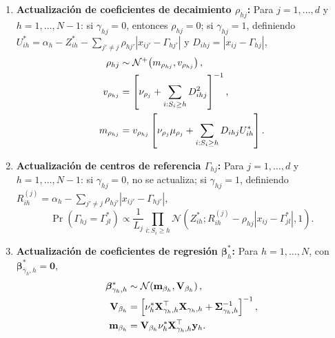 \begin{enumerate}
    \item \textbf{Actualización de coeficientes de decaimiento $\rho_{hj}$:}
    Para $j = 1, \dots, d$ y $h = 1, \dots, N-1$: si $\gamma_{hj} = 0$,
    entonces $\rho_{hj} = 0$; si $\gamma_{hj} = 1$, definiendo
    $U_{ih}^* = \alpha_h - Z_{ih}^* - \sum_{j' \neq j}\rho_{hj'}
    |x_{ij'} - \Gamma_{hj'}|$ y $D_{ihj} = |x_{ij} - \Gamma_{hj}|$,
    \begin{align}
    \rho_{hj} &\sim \mathcal{N}^+\!\left(m_{\rho_{hj}},
    v_{\rho_{hj}}\right), \notag\\
    v_{\rho_{hj}} &= \left[\nu_{\rho_j}
    + \sum_{i:S_i \geq h} D_{ihj}^2\right]^{-1}, \notag\\
    m_{\rho_{hj}} &= v_{\rho_{hj}}\left[\nu_{\rho_j}\mu_{\rho_j}
    + \sum_{i:S_i \geq h} D_{ihj} U_{ih}^*\right].
    \end{align}
 
    \item \textbf{Actualización de centros de referencia $\Gamma_{hj}$:}
    Para $j = 1, \dots, d$ y $h = 1, \dots, N-1$: si $\gamma_{hj} = 0$,
    no se actualiza; si $\gamma_{hj} = 1$, definiendo
    $R_{ih}^{(j)} = \alpha_h - \sum_{j' \neq j}\rho_{hj'}|x_{ij'} - \Gamma_{hj'}|$,
    \begin{equation}
        \Pr(\Gamma_{hj} = \Gamma_{jl}^*) \propto
        \frac{1}{L_j} \prod_{i:S_i \geq h}
        \mathcal{N}\!\left(Z_{ih}^*;
        R_{ih}^{(j)} - \rho_{hj}|x_{ij} - \Gamma_{jl}^*|, 1\right).
    \end{equation}
 
    \item \textbf{Actualización de coeficientes de regresión
    $\boldsymbol{\beta}_h^*$:} Para $h = 1, \dots, N$, con
    $\boldsymbol{\beta}_{\bar{\gamma}_h,h}^* = \mathbf{0}$,
    \begin{align}
        \boldsymbol{\beta}_{\gamma_h,h}^* &\sim
        \mathcal{N}\!\left(\mathbf{m}_{\beta_h},
        \mathbf{V}_{\beta_h}\right), \notag\\
        \mathbf{V}_{\beta_h} &= \left[\nu_h^*
        \mathbf{X}_{\gamma_h,h}^\top \mathbf{X}_{\gamma_h,h}
        + \boldsymbol{\Sigma}_{\gamma_h,h}^{-1}\right]^{-1}, \notag\\
        \mathbf{m}_{\beta_h} &= \mathbf{V}_{\beta_h}
        \nu_h^* \mathbf{X}_{\gamma_h,h}^\top \mathbf{y}_h.
    \end{align}
 

\end{enumerate}
